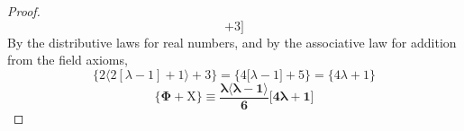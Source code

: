 \documentclass[preview]{standalone}
\begin{document}
\begin{proof}
\begin{equation*}
                +
            3
        \Bigg]
    \end{equation*}
    By the distributive laws for real numbers, 
    and by the associative law for addition from the field axioms,
    \begin{equation*}
        \bigg \{
            2 \Big \langle 2 [ \lambda - 1 ] + 1 \Big \rangle + 3
        \bigg \}
            =
        \bigg \{
            4 [ \lambda - 1 \big ] + 5
        \bigg \}
            =
        \bigg \{
            4 \lambda + 1
        \bigg \}
    \end{equation*}
    \bm{$\therefore$}
    \begin{equation*}
        \bm{
            \Bigg \{
                \Phi
                    +
                \mathrm{X}
            \Bigg \}
                \equiv
            \frac{
                \lambda
                \big \langle \lambda - 1 \big \rangle
            }
            {6}
            \Bigg[
                4 \lambda + 1
            \Bigg]
        }
    \end{equation*}
\color{lightgray} \end{proof}
\end{document}
